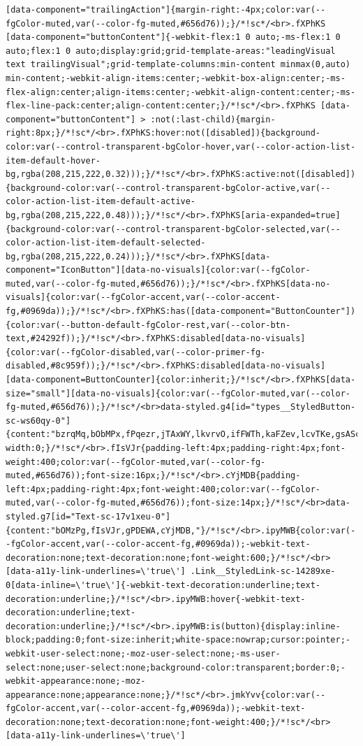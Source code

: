 \documentclass[
  letterpaper,
]{book}
\begin{document}
\begin{verbatim}
[data-component="trailingAction"]{margin-right:-4px;color:var(--fgColor-muted,var(--color-fg-muted,#656d76));}/*!sc*/<br>.fXPhKS [data-component="buttonContent"]{-webkit-flex:1 0 auto;-ms-flex:1 0 auto;flex:1 0 auto;display:grid;grid-template-areas:"leadingVisual text trailingVisual";grid-template-columns:min-content minmax(0,auto) min-content;-webkit-align-items:center;-webkit-box-align:center;-ms-flex-align:center;align-items:center;-webkit-align-content:center;-ms-flex-line-pack:center;align-content:center;}/*!sc*/<br>.fXPhKS [data-component="buttonContent"] > :not(:last-child){margin-right:8px;}/*!sc*/<br>.fXPhKS:hover:not([disabled]){background-color:var(--control-transparent-bgColor-hover,var(--color-action-list-item-default-hover-bg,rgba(208,215,222,0.32)));}/*!sc*/<br>.fXPhKS:active:not([disabled]){background-color:var(--control-transparent-bgColor-active,var(--color-action-list-item-default-active-bg,rgba(208,215,222,0.48)));}/*!sc*/<br>.fXPhKS[aria-expanded=true]{background-color:var(--control-transparent-bgColor-selected,var(--color-action-list-item-default-selected-bg,rgba(208,215,222,0.24)));}/*!sc*/<br>.fXPhKS[data-component="IconButton"][data-no-visuals]{color:var(--fgColor-muted,var(--color-fg-muted,#656d76));}/*!sc*/<br>.fXPhKS[data-no-visuals]{color:var(--fgColor-accent,var(--color-accent-fg,#0969da));}/*!sc*/<br>.fXPhKS:has([data-component="ButtonCounter"]){color:var(--button-default-fgColor-rest,var(--color-btn-text,#24292f));}/*!sc*/<br>.fXPhKS:disabled[data-no-visuals]{color:var(--fgColor-disabled,var(--color-primer-fg-disabled,#8c959f));}/*!sc*/<br>.fXPhKS:disabled[data-no-visuals] [data-component=ButtonCounter]{color:inherit;}/*!sc*/<br>.fXPhKS[data-size="small"][data-no-visuals]{color:var(--fgColor-muted,var(--color-fg-muted,#656d76));}/*!sc*/<br>data-styled.g4[id="types__StyledButton-sc-ws60qy-0"]{content:"bzrqMq,bObMPx,fPqezr,jTAxWY,lkvrvO,ifFWTh,kaFZev,lcvTKe,gsAScr,ipOGIj,jiwwtK,fXPhKS,"}/*!sc*/<br>.bOMzPg{min-width:0;}/*!sc*/<br>.fIsVJr{padding-left:4px;padding-right:4px;font-weight:400;color:var(--fgColor-muted,var(--color-fg-muted,#656d76));font-size:16px;}/*!sc*/<br>.cYjMDB{padding-left:4px;padding-right:4px;font-weight:400;color:var(--fgColor-muted,var(--color-fg-muted,#656d76));font-size:14px;}/*!sc*/<br>data-styled.g7[id="Text-sc-17v1xeu-0"]{content:"bOMzPg,fIsVJr,gPDEWA,cYjMDB,"}/*!sc*/<br>.ipyMWB{color:var(--fgColor-accent,var(--color-accent-fg,#0969da));-webkit-text-decoration:none;text-decoration:none;font-weight:600;}/*!sc*/<br>[data-a11y-link-underlines=\'true\'] .Link__StyledLink-sc-14289xe-0[data-inline=\'true\']{-webkit-text-decoration:underline;text-decoration:underline;}/*!sc*/<br>.ipyMWB:hover{-webkit-text-decoration:underline;text-decoration:underline;}/*!sc*/<br>.ipyMWB:is(button){display:inline-block;padding:0;font-size:inherit;white-space:nowrap;cursor:pointer;-webkit-user-select:none;-moz-user-select:none;-ms-user-select:none;user-select:none;background-color:transparent;border:0;-webkit-appearance:none;-moz-appearance:none;appearance:none;}/*!sc*/<br>.jmkYvv{color:var(--fgColor-accent,var(--color-accent-fg,#0969da));-webkit-text-decoration:none;text-decoration:none;font-weight:400;}/*!sc*/<br>[data-a11y-link-underlines=\'true\'] 
\end{verbatim}
\end{document}
